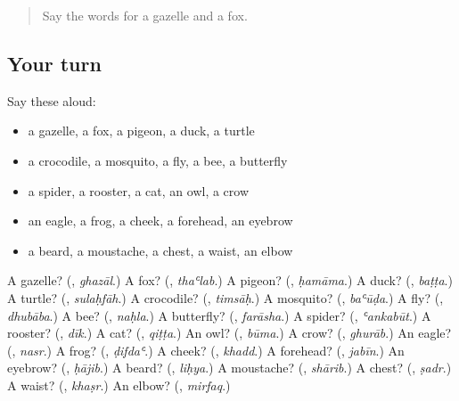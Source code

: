 \label{lesson:AR-R139-second-pass-animals}



\begin{quote}
Say the words for a gazelle and a fox.
\end{quote}

\subsection*{Your turn}
Say these aloud:

\begin{itemize}
\raggedright
  \item a gazelle, a fox, a pigeon, a duck, a turtle
  \item a crocodile, a mosquito, a fly, a bee, a butterfly
  \item a spider, a rooster, a cat, an owl, a crow
  \item an eagle, a frog, a cheek, a forehead, an eyebrow
  \item a beard, a moustache, a chest, a waist, an elbow
\end{itemize}

\begin{tcolorbox}[breakable,colback=teal!4,colframe=teal!35!black,title={Before you move on}]
A gazelle? (\textbf{}, \emph{ghazāl}.) A fox? (\textbf{}, \emph{thaʿlab}.) A pigeon? (\textbf{}, \emph{ḥamāma}.) A duck? (\textbf{}, \emph{baṭṭa}.) A turtle? (\textbf{}, \emph{sulaḥfāh}.) A crocodile? (\textbf{}, \emph{timsāḥ}.) A mosquito? (\textbf{}, \emph{baʿūḍa}.) A fly? (\textbf{}, \emph{dhubāba}.) A bee? (\textbf{}, \emph{naḥla}.) A butterfly? (\textbf{}, \emph{farāsha}.) A spider? (\textbf{}, \emph{ʿankabūt}.) A rooster? (\textbf{}, \emph{dīk}.) A cat? (\textbf{}, \emph{qiṭṭa}.) An owl? (\textbf{}, \emph{būma}.) A crow? (\textbf{}, \emph{ghurāb}.) An eagle? (\textbf{}, \emph{nasr}.) A frog? (\textbf{}, \emph{ḍifdaʿ}.) A cheek? (\textbf{}, \emph{khadd}.) A forehead? (\textbf{}, \emph{jabīn}.) An eyebrow? (\textbf{}, \emph{ḥājib}.) A beard? (\textbf{}, \emph{liḥya}.) A moustache? (\textbf{}, \emph{shārib}.) A chest? (\textbf{}, \emph{ṣadr}.) A waist? (\textbf{}, \emph{khaṣr}.) An elbow? (\textbf{}, \emph{mirfaq}.)
\end{tcolorbox}
